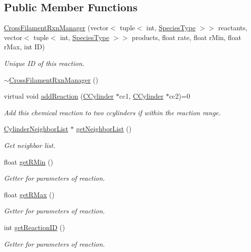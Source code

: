 \subsection*{Public Member Functions}
\begin{DoxyCompactItemize}
\item 
\hyperlink{classCrossFilamentRxnManager_a773d12131a70e970f6fee166f00bfb39}{Cross\+Filament\+Rxn\+Manager} (vector$<$ tuple$<$ int, \hyperlink{Species_8h_a50651af47c56ea0e27235468d23542cf}{Species\+Type} $>$$>$ reactants, vector$<$ tuple$<$ int, \hyperlink{Species_8h_a50651af47c56ea0e27235468d23542cf}{Species\+Type} $>$$>$ products, float rate, float r\+Min, float r\+Max, int I\+D)
\begin{DoxyCompactList}\small\item\em Unique I\+D of this reaction. \end{DoxyCompactList}\item 
\hyperlink{classCrossFilamentRxnManager_a3fff6c280b187f0c7641bec808ce6248}{$\sim$\+Cross\+Filament\+Rxn\+Manager} ()
\item 
virtual void \hyperlink{classCrossFilamentRxnManager_af43dae7fcbd4934577b5446034d65bfa}{add\+Reaction} (\hyperlink{classCCylinder}{C\+Cylinder} $\ast$cc1, \hyperlink{classCCylinder}{C\+Cylinder} $\ast$cc2)=0
\begin{DoxyCompactList}\small\item\em Add this chemical reaction to two ccylinders if within the reaction range. \end{DoxyCompactList}\item 
\hyperlink{classCylinderNeighborList}{Cylinder\+Neighbor\+List} $\ast$ \hyperlink{classCylinderNLContainer_afce343b3251cf0ed087cf5a62fb6aaee}{get\+Neighbor\+List} ()
\begin{DoxyCompactList}\small\item\em Get neighbor list. \end{DoxyCompactList}\end{DoxyCompactItemize}
{\bf }\par
\begin{DoxyCompactItemize}
\item 
float \hyperlink{classCrossFilamentRxnManager_aeb9207c18bb40c33d9c8fe99a006401d}{get\+R\+Min} ()
\begin{DoxyCompactList}\small\item\em Getter for parameters of reaction. \end{DoxyCompactList}\item 
float \hyperlink{classCrossFilamentRxnManager_a7fa04502185124176a72fb2f3965c698}{get\+R\+Max} ()
\begin{DoxyCompactList}\small\item\em Getter for parameters of reaction. \end{DoxyCompactList}\item 
int \hyperlink{classCrossFilamentRxnManager_aa5527049ea757ea2b22fca486d3bf08d}{get\+Reaction\+I\+D} ()
\begin{DoxyCompactList}\small\item\em Getter for parameters of reaction. \end{DoxyCompactList}\end{DoxyCompactItemize}


